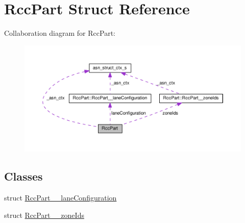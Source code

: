 \hypertarget{structRccPart}{}\section{Rcc\+Part Struct Reference}
\label{structRccPart}


Collaboration diagram for Rcc\+Part\+:\nopagebreak
\begin{figure}[H]
\begin{center}
\leavevmode
\includegraphics[width=350pt]{structRccPart__coll__graph}
\end{center}
\end{figure}
\subsection*{Classes}
\begin{DoxyCompactItemize}
\item 
struct \hyperlink{structRccPart_1_1RccPart____laneConfiguration}{Rcc\+Part\+\_\+\+\_\+lane\+Configuration}
\item 
struct \hyperlink{structRccPart_1_1RccPart____zoneIds}{Rcc\+Part\+\_\+\+\_\+zone\+Ids}
\end{DoxyCompactItemize}
